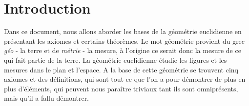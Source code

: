 \documentclass[a4paper,12pt]{article}
\begin{document}
\pagebreak
\section{Introduction}
Dans ce document, nous allons aborder les bases de la géométrie euclidienne en présentant les axiomes et certains théorèmes. Le mot géométrie provient du grec \textit{géo} - la terre et de \textit{métrie} - la mesure, à l'origine ce serait donc la mesure de ce qui fait partie de la terre.  La géométrie euclidienne étudie les figures et les mesures dans le plan et l'espace. A la base de cette géométrie se trouvent cinq axiomes et des définitions, qui sont tout ce que l'on a pour démontrer de plus en plus d'éléments, qui peuvent nous paraître triviaux tant ils sont omniprésents, mais qu'il a fallu démontrer.
\end{document}
